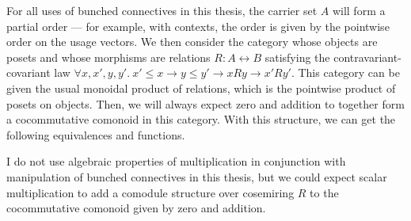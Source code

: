 For all uses of bunched connectives in this thesis, the carrier set $A$ will
form a partial order --- for example, with contexts, the order is given by the
pointwise order on the usage vectors.
We then consider the category whose objects are posets and whose morphisms are
relations $R : A \rel B$ satisfying the contravariant-covariant law
$\forall x,x',y,y'.~x' \leq x \to y \leq y' \to xRy \to x'Ry'$.
This category can be given the usual monoidal product of relations, which is
the pointwise product of posets on objects.
Then, we will always expect zero and addition to together form a cocommutative
comonoid in this category.
With this structure, we can get the following equivalences and functions.


I do not use algebraic properties of multiplication in conjunction with
manipulation of bunched connectives in this thesis, but we could expect
scalar multiplication
to add a comodule structure over cosemiring $R$ to the cocommutative comonoid
given by zero and addition.
